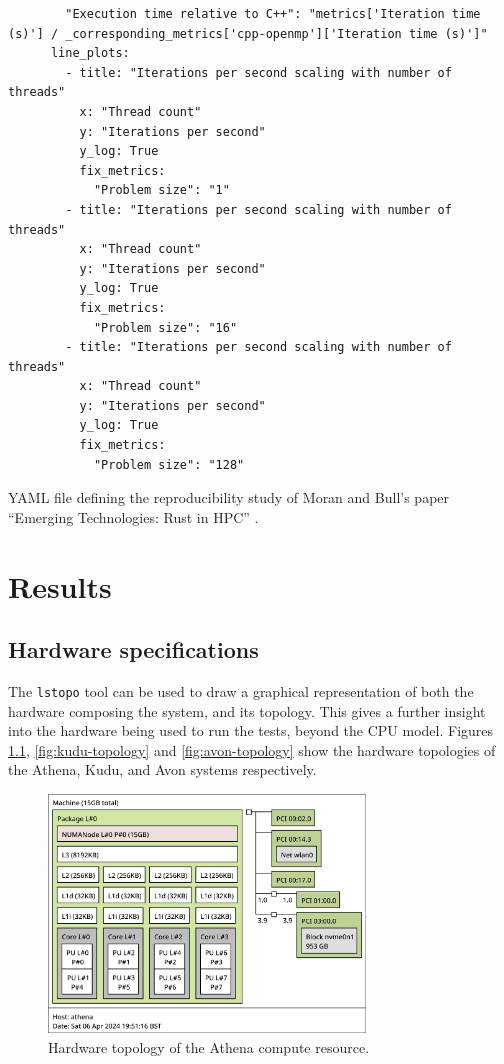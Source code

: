 \begin{code}
\begin{verbatim}
        "Execution time relative to C++": "metrics['Iteration time (s)'] / _corresponding_metrics['cpp-openmp']['Iteration time (s)']"
      line_plots:
        - title: "Iterations per second scaling with number of threads"
          x: "Thread count"
          y: "Iterations per second"
          y_log: True
          fix_metrics:
            "Problem size": "1"
        - title: "Iterations per second scaling with number of threads"
          x: "Thread count"
          y: "Iterations per second"
          y_log: True
          fix_metrics:
            "Problem size": "16"
        - title: "Iterations per second scaling with number of threads"
          x: "Thread count"
          y: "Iterations per second"
          y_log: True
          fix_metrics:
            "Problem size": "128"
    \end{verbatim}
    \caption{YAML file defining the reproducibility study of Moran and Bull's paper ``Emerging Technologies: Rust in HPC'' \cite{moranEmergingTechnologiesRust2023}.}
    \label{listing:replication-study-yaml-file}
\end{code}





\chapter{Results}
\label{ch:results-appendix}

\section{Hardware specifications}
\label{sec:hardware-specifications}

The \texttt{lstopo} tool can be used to draw a graphical representation of both the hardware composing the system, and its topology. This gives a further insight into the hardware being used to run the tests, beyond the CPU model. Figures \ref{fig:athena-topology}, \ref{fig:kudu-topology} and \ref{fig:avon-topology} show the hardware topologies of the Athena, Kudu, and Avon systems respectively.

\begin{figure}[H]
    \centering
    \includegraphics[width=0.75\textwidth]{images/8_appendix/athena-topology.png}
    \caption{Hardware topology of the Athena compute resource.}
    \label{fig:athena-topology}
\end{figure}

